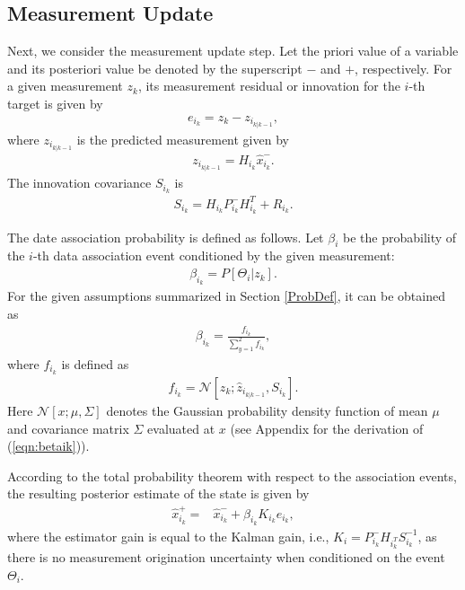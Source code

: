 \documentclass[letterpaper, 10pt, conference]{ieeeconf}
\newcommand{\refeqn}[1]{(\ref{eqn:#1})}
\begin{document}
\subsection{Measurement Update}

Next, we consider the measurement update step. Let  the priori value of a variable and its posteriori value be denoted by the superscript $-$ and $+$, respectively. For a given measurement $z_{k}$, its measurement residual or innovation for the $i$-th target is given by
\begin{align*}
e_{i_k} = z_k - z_{i_{k|k-1}},
\end{align*}
where $z_{i_{k|k-1}}$ is the predicted measurement given by
\begin{align}
z_{i_{k|k-1}} = H_{i_k} \hat x_{i_k}^-.
\end{align}
The innovation covariance $S_{i_k}$ is
\begin{align}
S_{i_k}=H_{i_k}P_{i_k}^{-}H_{i_k}^T+R_{i_k}.
\end{align}


The date association probability is defined as follows. Let $\beta_i$ be the probability of the $i$-th data association event conditioned by the given measurement:
\begin{align*}
\beta_{i_k} = P[\Theta_i|z_k].
\end{align*}
For the given assumptions summarized in Section \ref{ProbDef}, it can be obtained as
\begin{align}
\beta_{i_k}=\frac{f_{i_k}}{\sum\limits_{y=1}^2 f_{i_k}},\label{eqn:betaik}
\end{align}
where $f_{i_k}$ is defined as
\begin{align}
f_{i_k}=\mathcal{N}[z_{k};\hat z_{i_{k|k-1}},S_{i_k}].
\end{align}
Here $\mathcal{N}[x;\mu,\Sigma]$ denotes the Gaussian probability density function of mean $\mu$ and covariance matrix $\Sigma$ evaluated at $x$ (see Appendix for the derivation of \refeqn{betaik}).

According to the total probability theorem with respect to the association events, the resulting posterior estimate of the state is given by
\begin{align}
\hat x^+_{i_k}=&\hat x^-_{i_k}+\beta_{i_k}K_{i_k}e_{i_k}\label{KalEst},
\end{align}
where the estimator gain is equal to the Kalman gain, i.e., $K_i = P_{i_k}^{-} H_{i_k^T} S_{i_k}^{-1}$, as there is no measurement origination uncertainty when conditioned on the event $\Theta_i$. 
\end{document}
